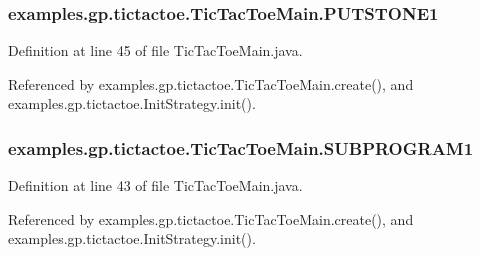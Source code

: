 \hypertarget{classexamples_1_1gp_1_1tictactoe_1_1_tic_tac_toe_main_ad90866667548bfa5b4f629c9eeeb6578}{
\subsubsection[{P\-U\-T\-S\-T\-O\-N\-E1}]{ examples.\-gp.\-tictactoe.\-Tic\-Tac\-Toe\-Main.\-P\-U\-T\-S\-T\-O\-N\-E1\hspace{0.3cm}{\ttfamily [static]}}}\label{classexamples_1_1gp_1_1tictactoe_1_1_tic_tac_toe_main_ad90866667548bfa5b4f629c9eeeb6578}


Definition at line 45 of file Tic\-Tac\-Toe\-Main.\-java.



Referenced by examples.\-gp.\-tictactoe.\-Tic\-Tac\-Toe\-Main.\-create(), and examples.\-gp.\-tictactoe.\-Init\-Strategy.\-init().

\hypertarget{classexamples_1_1gp_1_1tictactoe_1_1_tic_tac_toe_main_a59354385725397b3705333e608c144f7}{
\subsubsection[{S\-U\-B\-P\-R\-O\-G\-R\-A\-M1}]{ examples.\-gp.\-tictactoe.\-Tic\-Tac\-Toe\-Main.\-S\-U\-B\-P\-R\-O\-G\-R\-A\-M1\hspace{0.3cm}{\ttfamily [static]}}}\label{classexamples_1_1gp_1_1tictactoe_1_1_tic_tac_toe_main_a59354385725397b3705333e608c144f7}


Definition at line 43 of file Tic\-Tac\-Toe\-Main.\-java.



Referenced by examples.\-gp.\-tictactoe.\-Tic\-Tac\-Toe\-Main.\-create(), and examples.\-gp.\-tictactoe.\-Init\-Strategy.\-init().

